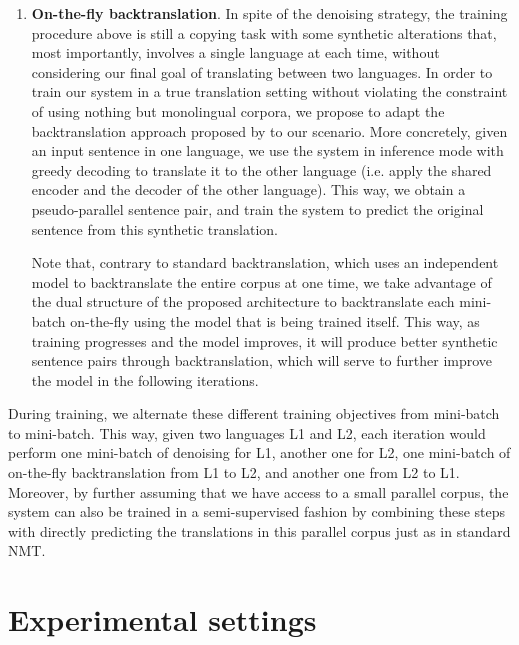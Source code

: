 \documentclass{article} \usepackage{iclr2018_conference,times}
\begin{document}
\begin{enumerate}
\item \textbf{On-the-fly backtranslation}. In spite of the denoising strategy, the training procedure above is still a copying task with some synthetic alterations that, most importantly, involves a single language at each time, without considering our final goal of translating between two languages. In order to train our system in a true translation setting without violating the constraint of using nothing but monolingual corpora, we propose to adapt the backtranslation approach proposed by \citet{sennrich2016improving} to our scenario. More concretely, given an input sentence in one language, we use the system in inference mode with greedy decoding to translate it to the other language (i.e. apply the shared encoder and the decoder of the other language). This way, we obtain a pseudo-parallel sentence pair, and train the system to predict the original sentence from this synthetic translation.

Note that, contrary to standard backtranslation, which uses an independent model to backtranslate the entire corpus at one time, we take advantage of the dual structure of the proposed architecture to backtranslate each mini-batch on-the-fly using the model that is being trained itself. This way, as training progresses and the model improves, it will produce better synthetic sentence pairs through backtranslation, which will serve to further improve the model in the following iterations.
\end{enumerate}

During training, we alternate these different training objectives from mini-batch to mini-batch. This way, given two languages L1 and L2, each iteration would perform one mini-batch of denoising for L1, another one for L2, one mini-batch of on-the-fly backtranslation from L1 to L2, and another one from L2 to L1. Moreover, by further assuming that we have access to a small parallel corpus, the system can also be trained in a semi-supervised fashion by combining these steps with directly predicting the translations in this parallel corpus just as in standard NMT.


\section{Experimental settings} 
\label{sec:experimental_settings}
\end{document}
